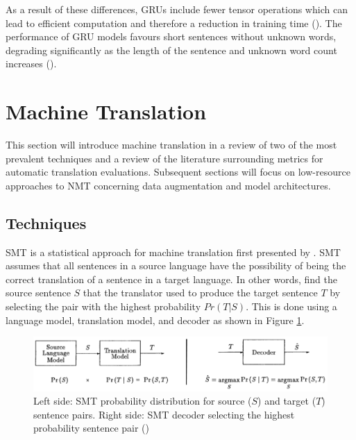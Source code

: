 As a result of these differences, \acrshort{GRU}s include fewer tensor operations which can lead to efficient computation and therefore a reduction in training time (\cite{chung_gru_2014}).
The performance of \acrshort{GRU} models favours short sentences without unknown words, degrading significantly as the length of the sentence and unknown word count increases (\cite{cho_properties_2014}).

\section{Machine Translation}
\label{Machine Translation}

This section will introduce machine translation in a review of two of the most prevalent techniques and a review of the literature surrounding metrics for automatic translation evaluations. Subsequent sections will focus on low-resource approaches to \acrshort{NMT} concerning data augmentation and model architectures.

\subsection{Techniques}


\acrfull{SMT} is a statistical approach for machine translation first presented by \cite{brown_statistical_1990}. 
\acrshort{SMT} assumes that all sentences in a source language have the possibility of being the correct translation of a sentence in a target language. 
In other words, find the source sentence $S$ that the translator used to produce the target sentence $T$ by selecting the pair with the highest probability $Pr ( T | S )$.
This is done using a language model, translation model, and decoder as shown in Figure \ref{fig:smt_diagram}.

\begin{figure}[ht!]
\centering
\includegraphics[width=1\textwidth]{media/literature/machine_translation/smt_3.png}
\caption[Diagram of \acrshort{SMT} probability distribution and decoder]{Left side: \acrshort{SMT} probability distribution for source ($S$) and target ($T$) sentence pairs. Right side: \acrshort{SMT} decoder selecting the highest probability sentence pair (\cite{brown_statistical_1990})}
\label{fig:smt_diagram}
\end{figure}

